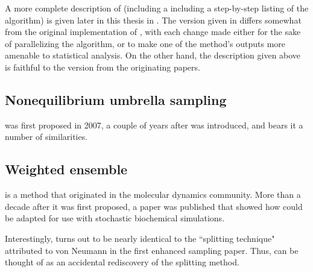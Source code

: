 
A more complete description of  (including a including a step-by-step listing of the algorithm) is given later in this thesis in . The version given in  differs somewhat from the original implementation of , with each change made either for the sake of parallelizing the algorithm, or to make one of the method's outputs more amenable to statistical analysis. On the other hand, the description given above is faithful to the version from the originating papers\cite{Allen:2005wy,Allen:2006cp,Allen:2009kb}.

\subsection{Nonequilibrium umbrella sampling}
 was first proposed\cite{Warmflash:2007dz} in 2007, a couple of years after  was introduced, and bears it a number of similarities.  \cite{Dickson:2009gt,Dickson:2009fua}


\subsection{Weighted ensemble}
 is a method that originated\cite{Huber:1996dn} in the molecular dynamics community. More than a decade after it was first proposed, a paper\cite{Bhatt:2010df} was published that showed how  could be adapted for use with stochastic biochemical simulations. 
\cite{Donovan:2013gz,Donovan:2016bi,Zuckerman:2017eq}


Interestingly,  turns out to be nearly identical to the ``splitting technique" attributed to von Neumann in the first enhanced sampling paper\cite{Kahn:1951es}. Thus,  can be thought of as an accidental rediscovery of the splitting method\cite{Chong:2017bv}.

